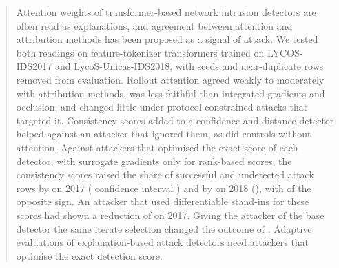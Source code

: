 \begin{abstract}
Attention weights of transformer-based network intrusion detectors are often read as explanations, and agreement
between attention and attribution methods has been proposed as a signal of attack.
We tested both readings on feature-tokenizer transformers trained on LYCOS-IDS2017 and LycoS-Unicas-IDS2018, with
\nSeeds{} seeds and near-duplicate rows removed from evaluation.
Rollout attention agreed weakly to moderately with attribution methods, was less faithful than integrated gradients
and occlusion, and changed little under protocol-constrained attacks that targeted it.
Consistency scores added to a confidence-and-distance detector helped against an attacker that ignored them, as did
controls without attention.
Against attackers that optimised the exact score of each detector, with surrogate gradients only for \nRankScores{}
rank-based scores, the consistency scores raised the share of successful and undetected attack rows by
\axHeadVoneSeventeenAbs{} on 2017 (\paramCILevel{} confidence interval \axHeadVoneSeventeenCI) and by
\axHeadVoneEighteenAbs{} on 2018 (\axHeadVoneEighteenCI), with \axHeadOppSeedsPhrase{} of the opposite sign.
An attacker that used differentiable stand-ins for these scores had shown a reduction of \axStandinVoneSeventeenAbs{}
on 2017.
Giving the attacker of the base detector the same iterate selection changed the outcome of \sxOutcomeChangedPhrase.
Adaptive evaluations of explanation-based attack detectors need attackers that optimise the exact detection score.
\end{abstract}
